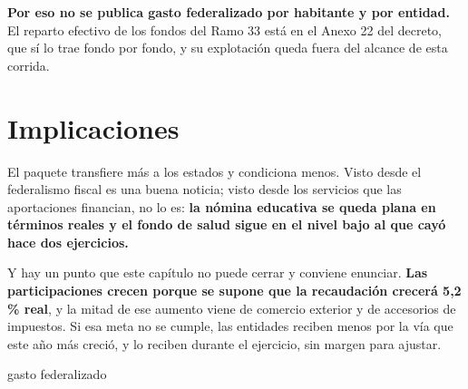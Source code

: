\textbf{Por eso no se publica gasto federalizado por habitante y por entidad.} El reparto
efectivo de los fondos del Ramo 33 está en el Anexo 22 del decreto, que sí lo trae fondo por
fondo, y su explotación queda fuera del alcance de esta corrida.

\section{Implicaciones}

El paquete transfiere más a los estados y condiciona menos. Visto desde el federalismo fiscal
es una buena noticia; visto desde los servicios que las aportaciones financian, no lo es:
\textbf{la nómina educativa se queda plana en términos reales y el fondo de salud sigue en el
nivel bajo al que cayó hace dos ejercicios.}

Y hay un punto que este capítulo no puede cerrar y conviene enunciar. \textbf{Las
participaciones crecen porque se supone que la recaudación crecerá 5,2\,\% real}, y la mitad
de ese aumento viene de comercio exterior y de accesorios de impuestos. Si esa meta no se
cumple, las entidades reciben menos por la vía que este año más creció, y lo reciben durante
el ejercicio, sin margen para ajustar.

\begin{ficha}{gasto federalizado}
\end{ficha}
\clearpage
